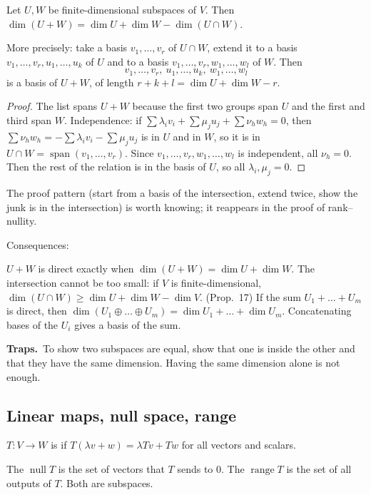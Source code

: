 \documentclass[11pt]{scrartcl}
\DeclareMathOperator{\nul}{null}
\DeclareMathOperator{\range}{range}
\DeclareMathOperator{\spn}{span}
\newcommand{\traps}{\par\medskip\noindent\textbf{\color{RawSienna}Traps.}\ }
\begin{document}
\begin{theorem*}
  Let $U,W$ be finite-dimensional subspaces of $V$. Then $\dim(U+W)=\dim U+\dim W-\dim(U\cap W)$.

  More precisely: take a basis $v_1,\dots,v_r$ of $U\cap W$, extend it to a basis $v_1,\dots,v_r,u_1,\dots,u_k$ of $U$ and to a basis $v_1,\dots,v_r,w_1,\dots,w_l$ of $W$. Then
  \[ v_1,\dots,v_r,\ u_1,\dots,u_k,\ w_1,\dots,w_l \]
  is a basis of $U+W$, of length $r+k+l=\dim U+\dim W-r$.
\end{theorem*}
\begin{proof}
  The list spans $U+W$ because the first two groups span $U$ and the first and third span $W$.
  Independence: if $\sum\lambda_iv_i+\sum\mu_ju_j+\sum\nu_hw_h=0$, then $\sum\nu_hw_h=-\sum\lambda_iv_i-\sum\mu_ju_j$ is in $U$ and in $W$, so it is in $U\cap W=\spn(v_1,\dots,v_r)$. Since $v_1,\dots,v_r,w_1,\dots,w_l$ is independent, all $\nu_h=0$. Then the rest of the relation is in the basis of $U$, so all $\lambda_i,\mu_j=0$.
\end{proof}
The proof pattern (start from a basis of the intersection, extend twice, show the junk is in the intersection) is worth knowing; it reappears in the proof of rank--nullity.

Consequences:
\begin{itemize}
  \ii $U+W$ is direct exactly when $\dim(U+W)=\dim U+\dim W$.
  \ii The intersection cannot be too small: if $V$ is finite-dimensional, $\dim(U\cap W)\ge\dim U+\dim W-\dim V$.
  \ii (Prop.~17) If the sum $U_1+\dots+U_m$ is direct, then $\dim(U_1\oplus\dots\oplus U_m)=\dim U_1+\dots+\dim U_m$. Concatenating bases of the $U_i$ gives a basis of the sum.
\end{itemize}

\traps To show two subspaces are equal, show that one is inside the other and that they have the same dimension. Having the same dimension alone is not enough.

\subsection{Linear maps, null space, range}
\begin{definition*}
  $T\colon V\to W$ is  if $T(\lambda v+w)=\lambda Tv+Tw$ for all vectors and scalars.

  The  $\nul T$ is the set of vectors that $T$ sends to $0$.
  The  $\range T$ is the set of all outputs of $T$.
  Both are subspaces.
\end{definition*}
\end{document}

